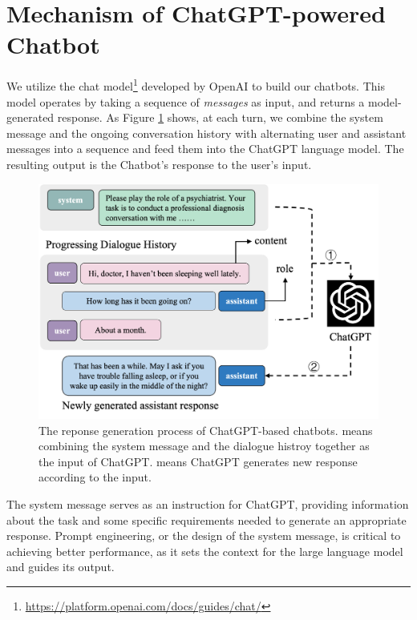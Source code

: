 \section{Mechanism of ChatGPT-powered Chatbot}
We utilize the chat model\footnote{\url{https://platform.openai.com/docs/guides/chat/}} developed by OpenAI to build our chatbots. 
This model operates by taking a sequence of \textit{messages} as input, and returns a model-generated response. 
As Figure \ref{fig:process} shows, at each turn, we combine the system message and the ongoing conversation history with alternating user and assistant messages into a sequence and feed them into the ChatGPT language model. The resulting output is the Chatbot's response to the user's input.
\begin{figure}[th]
	\centering
	\includegraphics[width=0.95\linewidth]{Figures/process_v2.png}
	\caption{The reponse generation process of ChatGPT-based chatbots.  means combining the system message and the dialogue histroy together as the input of ChatGPT.  means ChatGPT generates new response according to the input.}
	\label{fig:process}
\end{figure}

The system message serves as an instruction for ChatGPT, providing information about the task and some specific requirements needed to generate an appropriate response. Prompt engineering, or the design of the system message, is critical to achieving better performance, as it sets the context for the large language model and guides its output.

